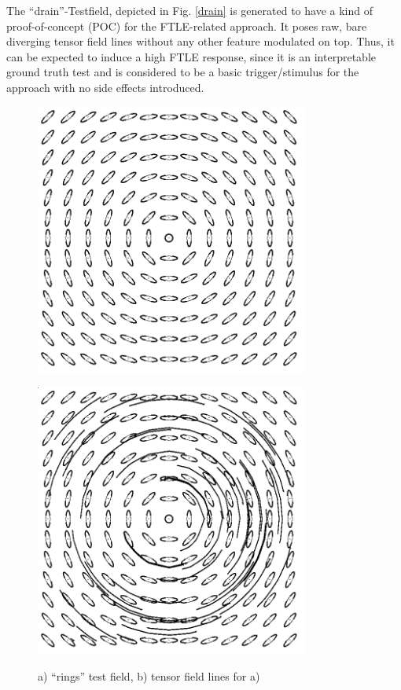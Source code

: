 \documentclass{scrartcl}
\begin{document}
The ``drain''-Testfield, depicted in Fig. \ref{drain} is generated to have a kind of proof-of-concept (POC) for the FTLE-related approach. It poses raw, bare diverging tensor field lines without any other feature modulated on top. Thus, it can be expected to induce a high FTLE response, since it is an interpretable ground truth test and is considered to be a basic trigger/stimulus for the approach with no side effects introduced.

\begin{figure}[!t]
\centering
  \begin{minipage}{0.4\textwidth}
    \includegraphics[width=0.8\textwidth]{img/rings.png}
    \label{a)}
  \end{minipage}
  \begin{minipage}{0.4\textwidth}
    \includegraphics[width=0.8\textwidth]{img/tensorfieldlines.png}
    \label{b)}
  \end{minipage}
\caption{a) ``rings'' test field, b) tensor field lines for a)}
\label{rings}
\end{figure}
\end{document}
